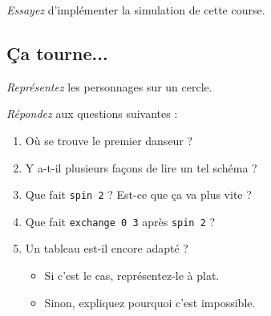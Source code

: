 \begin{exo}[Préparation]
\emph{Essayez} d'implémenter la simulation de cette course.
\end{exo}

\subsection{Ça tourne...}

\begin{exo}[Préparation]
\emph{Représentez} les personnages sur un cercle.
\end{exo}

\begin{exo}
\emph{Répondez} aux questions suivantes :
\begin{enumerate}
\item Où se trouve le premier danseur ?
\item Y a-t-il plusieurs façons de lire un tel schéma ?
\item Que fait \texttt{spin 2} ? Est-ce que ça va plus vite ?
\item Que fait \texttt{exchange 0 3} après \texttt{spin 2} ?
\item Un tableau est-il encore adapté ?
	\begin{itemize}
	\item Si c'est le cas, représentez-le à plat.
	\item Sinon, expliquez pourquoi c'est impossible.
	\end{itemize}
\end{enumerate}
\end{exo}


